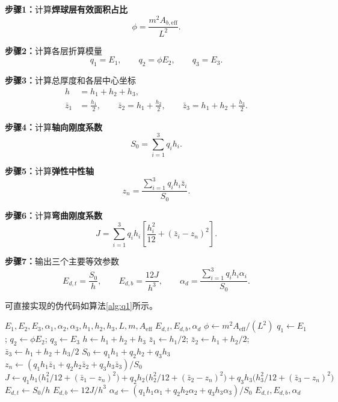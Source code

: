 \documentclass[draft,12pt,a4paper]{ctexart}
\theoremstyle{definition}
\begin{document}
\textbf{步骤1：}计算\textbf{焊球层有效面积占比}
\begin{equation}
\phi=\frac{m^2 A_{b,\mathrm{eff}}}{L^2}.
\end{equation}

\textbf{步骤2：}计算各层折算模量
\begin{equation}
q_1=E_1,\qquad q_2=\phi E_2,\qquad q_3=E_3.
\end{equation}

\textbf{步骤3：}计算总厚度和各层中心坐标
\begin{align}
h&=h_1+h_2+h_3,\\
\bar{z}_1&=\frac{h_1}{2},\qquad
\bar{z}_2=h_1+\frac{h_2}{2},\qquad
\bar{z}_3=h_1+h_2+\frac{h_3}{2}.
\end{align}

\textbf{步骤4：}计算\textbf{轴向刚度系数}
\begin{equation}
S_0=\sum_{i=1}^{3}q_i h_i.
\end{equation}

\textbf{步骤5：}计算\textbf{弹性中性轴}
\begin{equation}
z_n=\frac{\sum_{i=1}^{3}q_i h_i\bar{z}_i}{S_0}.
\end{equation}

\textbf{步骤6：}计算\textbf{弯曲刚度系数}
\begin{equation}
J=\sum_{i=1}^{3}q_i h_i
\left[\frac{h_i^2}{12}+(\bar{z}_i-z_n)^2\right].
\end{equation}

\textbf{步骤7：}输出三个主要等效参数
\begin{equation}
E_{d,t}=\frac{S_0}{h},\qquad
E_{d,b}=\frac{12J}{h^3},\qquad
\alpha_d=\frac{\sum_{i=1}^{3}q_i h_i\alpha_i}{S_0}.
\end{equation}

可直接实现的伪代码如算法\ref{alg:q1}所示。

\begin{algorithm}[H]
\caption{问题一等效参数计算流程}\label{alg:q1}
\begin{algorithmic}[1]
\Require $E_1,E_2,E_3,\alpha_1,\alpha_2,\alpha_3,h_1,h_2,h_3,L,m,A_{\mathrm{eff}}$
\Ensure $E_{d,t},E_{d,b},\alpha_d$
\State $\phi \leftarrow m^2 A_{\mathrm{eff}}/(L^2)$
\State $q_1 \leftarrow E_1$; \quad $q_2 \leftarrow \phi E_2$; \quad $q_3 \leftarrow E_3$
\State $h \leftarrow h_1+h_2+h_3$
\State $\bar{z}_1 \leftarrow h_1/2$; \quad $\bar{z}_2 \leftarrow h_1+h_2/2$; \quad $\bar{z}_3 \leftarrow h_1+h_2+h_3/2$
\State $S_0 \leftarrow q_1 h_1+q_2 h_2+q_3 h_3$
\State $z_n \leftarrow (q_1 h_1\bar{z}_1+q_2 h_2\bar{z}_2+q_3 h_3\bar{z}_3)/S_0$
\State $J \leftarrow q_1 h_1\bigl(h_1^2/12+(\bar{z}_1-z_n)^2\bigr)+q_2 h_2\bigl(h_2^2/12+(\bar{z}_2-z_n)^2\bigr)+q_3 h_3\bigl(h_3^2/12+(\bar{z}_3-z_n)^2\bigr)$
\State $E_{d,t} \leftarrow S_0/h$
\State $E_{d,b} \leftarrow 12J/h^3$
\State $\alpha_d \leftarrow (q_1 h_1\alpha_1+q_2 h_2\alpha_2+q_3 h_3\alpha_3)/S_0$
\State \Return $E_{d,t},E_{d,b},\alpha_d$
\end{algorithmic}
\end{algorithm}
\end{document}
